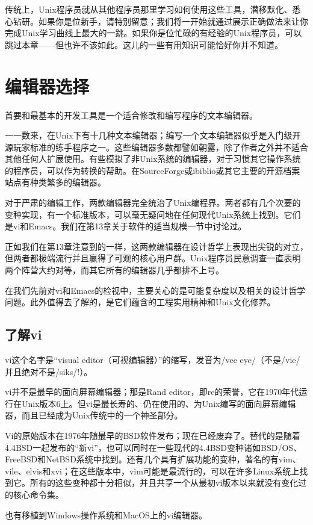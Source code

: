 \documentclass[12pt,oneside]{ctexbook}
\begin{document}
\begin{common-format}
传统上，Unix程序员就从其他程序员那里学习如何使用这些工具，潜移默化、悉心钻研。如果你是位新手，请特别留意；我们将一开始就通过展示正确做法来让你完成Unix学习曲线上最大的一跳。如果你是位忙碌的有经验的Unix程序员，可以跳过本章——但也许不该如此。这儿的一些有用知识可能恰好你并不知道。

\section{编辑器选择}
首要和最基本的开发工具是一个适合修改和编写程序的文本编辑器。

一一数来，在Unix下有十几种文本编辑器；编写一个文本编辑器似乎是入门级开源玩家标准的练手程序之一。这些编辑器多数都譬如朝露，除了作者之外并不适合其他任何人扩展使用。有些模拟了非Unix系统的编辑器，对于习惯其它操作系统的程序员，可以作为转换的帮助。在SourceForge或ibiblio或其它主要的开源档案站点有种类繁多的编辑器。

对于严肃的编辑工作，两款编辑器完全统治了Unix编程界。两者都有几个次要的变种实现，有一个标准版本，可以毫无疑问地在任何现代Unix系统上找到。它们是vi和Emacs。我们在第13章关于软件的适当规模一节中讨论过。

正如我们在第13章注意到的一样，这两款编辑器在设计哲学上表现出尖锐的对立，但两者都极端流行并且赢得了可观的核心用户群。Unix程序员民意调查一直表明两个阵营大约对等，而其它所有的编辑器几乎都排不上号。

在我们先前对vi和Emacs的检视中，主要关心的是可能复杂度以及相关的设计哲学问题。此外值得去了解的，是它们蕴含的工程实用精神和Unix文化修养。

\subsection{了解vi}
vi这个名字是“visual editor（可视编辑器）”的缩写，发音为/vee eye/（不是/vie/并且绝对不是/siks/!）。

vi并不是最早的面向屏幕编辑器；那是Rand editor，即re的荣誉，它在1970年代运行在Unix版本6上。但vi是最长寿的、仍在使用的、为Unix编写的面向屏幕编辑器，而且已经成为Unix传统中的一个神圣部分。

Vi的原始版本在1976年随最早的BSD软件发布；现在已经废弃了。替代的是随着4.4BSD一起发布的“新vi”，也可以同时在一些现代的4.4BSD变种诸如BSD/OS、FreeBSD和NetBSD系统中找到。还有几个具有扩展功能的变种，著名的有vim、vile、elvis和xvi；在这些版本中，vim可能是最流行的，可以在许多Linux系统上找到它。所有的这些变种都十分相似，并且共享一个从最初vi版本以来就没有变化过的核心命令集。

也有移植到Windows操作系统和MacOS上的vi编辑器。


\end{common-format}
\end{document}
